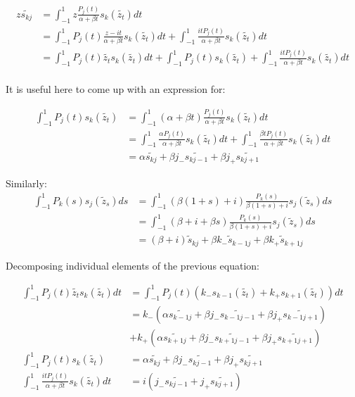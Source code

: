 \documentclass{article}
\begin{document}
\begin{align}
	z\tilde{s_{kj}}&=\int_{-1}^1z\frac{P_j(t)}{\alpha+\beta t}s_k(\tilde{z_t})dt\\
	&=\int_{-1}^1P_j(t)\frac{z-it}{\alpha+\beta t}s_k(\tilde{z_t})dt
	+\int_{-1}^1\frac{itP_j(t)}{\alpha+\beta t}s_k(\tilde{z_t})dt\\
	&=\int_{-1}^1P_j(t)\tilde{z_t}s_k(\tilde{z_t})dt
	+\int_{-1}^1P_j(t)s_k(\tilde{z_t})
	+\int_{-1}^1\frac{itP_j(t)}{\alpha+\beta t}s_k(\tilde{z_t})dt\\
\end{align}

It is useful here to come up with an expression for:

\begin{align}
    \int_{-1}^1P_j(t)s_k(\tilde{z_t}) &= \int_{-1}^1(\alpha+\beta t)\frac{P_j(t)}{\alpha + \beta t} s_k(\tilde{z_t})dt\\
    &= \int_{-1}^1\frac{\alpha P_j(t)}{\alpha+\beta t}s_k(\tilde{z_t})dt+\int_{-1}^1\frac{\beta tP_j(t)}{\alpha+\beta t}s_k(\tilde{z_t})dt\\
    &= \alpha\tilde{s_{kj}} + \beta j_-\tilde{s_{kj-1}}+\beta j_+\tilde{s_{kj+1}}
\end{align}

Similarly:
\begin{align}
    \int_{-1}^1P_k(s)s_j(\tilde{z}_s)ds &= \int_{-1}^1(\beta(1+s)+i)\frac{P_k(s)}{\beta(1+s)+i}s_j(\tilde{z}_s)ds\\
    &=\int_{-1}^1(\beta+i+\beta s)\frac{P_k(s)}{\beta(1+s)+i}s_j(\tilde{z}_s)ds\\
    &=(\beta+i)\tilde{s}_{kj}+\beta k_-\tilde{s}_{k-1j}+\beta k_+\tilde{s}_{k+1j}
\end{align}

Decomposing individual elements of the previous equation:

\begin{align}
	\int_{-1}^1P_j(t)\tilde{z_t}s_k(\tilde{z_t})dt&=\int_{-1}^1P_j(t)(k_-s_{k-1}(\tilde{z_t})+k_+s_{k+1}(\tilde{z_t}))dt\\
	&= k_-(\alpha\tilde{s_{k-1j}}+\beta j_-\tilde{s_{k-1j-1}}+\beta j_+\tilde{s_{k-1j+1}})\\
	&+ k_+(\alpha\tilde{s_{k+1j}}+\beta j_-\tilde{s_{k+1j-1}}+\beta j_+\tilde{s_{k+1j+1}})\\
	\int_{-1}^1P_j(t)s_k(\tilde{z_t}) &= \alpha\tilde{s_{kj}} + \beta j_-\tilde{s_{kj-1}}+\beta j_+\tilde{s_{kj+1}}\\
	\int_{-1}^1\frac{itP_j(t)}{\alpha+\beta t}s_k(\tilde{z_t})dt &= i(j_-\tilde{s_{kj-1}}+j_+\tilde{s_{kj+1}})
\end{align}
\end{document}
